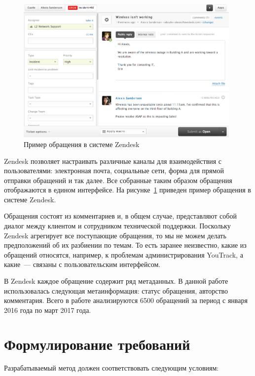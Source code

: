 \begin{figure}[tph!]
\centerline{\includegraphics[width=11cm]{fig/zendesk2.png}}
    \caption{Пример обращения в системе Zendesk}
    \label{fig:zdesk_ticket}
\end{figure}

Zendesk позволяет настраивать различные каналы для взаимодействия с пользователями: электронная почта, социальные сети, форма для прямой отправки обращений и так далее. Все собранные таким образом обращения отображаются в едином интерфейсе. На рисунке~\ref{fig:zdesk_ticket} приведен пример обращения в системе Zendesk. 

Обращения состоят из комментариев и, в общем случае, представляют собой диалог между клиентом и сотрудником технической поддержки. Поскольку Zendesk агрегирует все поступающие  обращения, то мы не можем делать предположений об их разбиении по темам. То есть заранее неизвестно, какие из обращений относятся, например, к проблемам администрирования YouTrack, а какие~--- связаны с пользовательским интерфейсом.

В Zendesk каждое обращение содержит ряд метаданных. В данной работе использовалась следующая метаинформация: статус обращения, авторство комментария. Всего в работе анализируются 6500 обращений за период с января 2016 года по март 2017 года. 

\section{Формулирование требований}
\label{sec:features}

Разрабатываемый метод должен соответствовать следующим условиям:


